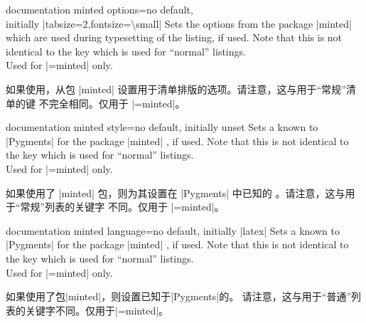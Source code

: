 \begin{docTcbKey}{documentation minted options}{=}{no default,\\\hspace*{\fill} initially |tabsize=2,fontsize=\textbackslash small|}
Sets the options from the package |minted| \cite{poore:minted}
which are used during typesetting of the listing, if used.
Note that this is not identical to the key
 which is used for \enquote{normal} listings.\\
Used for |=minted| only.

如果使用，从包 |minted| \cite{poore:minted} 设置用于清单排版的选项。请注意，这与用于“常规”清单的键  不完全相同。仅用于 |=minted|。
\end{docTcbKey}

\begin{docTcbKey}{documentation minted style}{=}{no default, initially unset}
Sets a  known to |Pygments| \cite{pygments:web} for
the package |minted| \cite{poore:minted}, if used.
Note that this is not identical to the key
 which is used for \enquote{normal} listings.\\
Used for |=minted| only.

如果使用了 |minted| \cite{poore:minted} 包，则为其设置在 |Pygments| \cite{pygments:web} 中已知的 。请注意，这与用于“常规”列表的关键字  不同。仅用于 |=minted|。
\end{docTcbKey}

\begin{docTcbKey}[][doc new=2017-04-24]{documentation minted language}{=}{no default, initially |latex|}
Sets a  known to |Pygments| \cite{pygments:web}
for the package |minted| \cite{poore:minted}, if used.
Note that this is not identical to the key
 which is used for \enquote{normal} listings.\\
Used for |=minted| only.

如果使用了包|minted|\cite{poore:minted}，则设置已知于|Pygments|\cite{pygments:web}的。 请注意，这与用于“普通”列表的关键字不同。仅用于|=minted|。
\end{docTcbKey}


